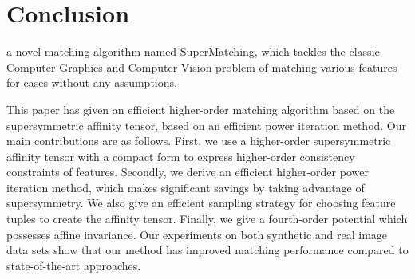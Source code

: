 \section{Conclusion}
\label{sec:conclusion}
a novel matching algorithm named SuperMatching, which tackles the classic Computer Graphics and Computer Vision problem of matching various features for cases without any assumptions.

This paper has given an efficient higher-order matching algorithm based on the supersymmetric affinity tensor, based on an efficient power iteration method. Our main contributions are as follows.
First, we use a  higher-order supersymmetric affinity tensor with a compact form to express higher-order consistency constraints of features. Secondly, we derive an efficient higher-order power iteration method, which makes significant savings by taking advantage of supersymmetry. We also give an efficient sampling strategy for choosing feature tuples to create the affinity tensor. Finally, we give a fourth-order potential which possesses affine invariance. Our experiments on both synthetic and real image data sets show that our method has improved matching performance compared to state-of-the-art approaches.

\appendix
